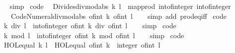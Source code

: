\begin{isabellebody}
%
\isadelimproof
\ \ %
\endisadelimproof
%
\isatagproof
{}\isamarkupfalse%
\ simp%
\endisatagproof
{\isafoldproof}%
%
\isadelimproof
\isanewline
%
\endisadelimproof
\isanewline
{}\isamarkupfalse%
\ {\isacharbrackleft}code{\isacharbrackright}{\isacharcolon}\isanewline
\ \ {\isachardoublequoteopen}Divides{\isachardot}divmod{\isacharunderscore}abs\ k\ l\ {\isacharequal}\ map{\isacharunderscore}prod\ int{\isacharunderscore}of{\isacharunderscore}integer\ int{\isacharunderscore}of{\isacharunderscore}integer\isanewline
\ \ \ \ {\isacharparenleft}Code{\isacharunderscore}Numeral{\isachardot}divmod{\isacharunderscore}abs\ {\isacharparenleft}of{\isacharunderscore}int\ k{\isacharparenright}\ {\isacharparenleft}of{\isacharunderscore}int\ l{\isacharparenright}{\isacharparenright}{\isachardoublequoteclose}\isanewline
%
\isadelimproof
\ \ %
\endisadelimproof
%
\isatagproof
{}\isamarkupfalse%
\ {\isacharparenleft}simp\ add{\isacharcolon}\ prod{\isacharunderscore}eq{\isacharunderscore}iff{\isacharparenright}%
\endisatagproof
{\isafoldproof}%
%
\isadelimproof
\isanewline
%
\endisadelimproof
\isanewline
{}\isamarkupfalse%
\ {\isacharbrackleft}code{\isacharbrackright}{\isacharcolon}\isanewline
\ \ {\isachardoublequoteopen}k\ div\ l\ {\isacharequal}\ int{\isacharunderscore}of{\isacharunderscore}integer\ {\isacharparenleft}of{\isacharunderscore}int\ k\ div\ of{\isacharunderscore}int\ l{\isacharparenright}{\isachardoublequoteclose}\isanewline
%
\isadelimproof
\ \ %
\endisadelimproof
%
\isatagproof
{}\isamarkupfalse%
\ simp%
\endisatagproof
{\isafoldproof}%
%
\isadelimproof
\isanewline
%
\endisadelimproof
\isanewline
{}\isamarkupfalse%
\ {\isacharbrackleft}code{\isacharbrackright}{\isacharcolon}\isanewline
\ \ {\isachardoublequoteopen}k\ mod\ l\ {\isacharequal}\ int{\isacharunderscore}of{\isacharunderscore}integer\ {\isacharparenleft}of{\isacharunderscore}int\ k\ mod\ of{\isacharunderscore}int\ l{\isacharparenright}{\isachardoublequoteclose}\isanewline
%
\isadelimproof
\ \ %
\endisadelimproof
%
\isatagproof
{}\isamarkupfalse%
\ simp%
\endisatagproof
{\isafoldproof}%
%
\isadelimproof
\isanewline
%
\endisadelimproof
\isanewline
{}\isamarkupfalse%
\ {\isacharbrackleft}code{\isacharbrackright}{\isacharcolon}\isanewline
\ \ {\isachardoublequoteopen}HOL{\isachardot}equal\ k\ l\ {\isacharequal}\ HOL{\isachardot}equal\ {\isacharparenleft}of{\isacharunderscore}int\ k\ {\isacharcolon}{\isacharcolon}\ integer{\isacharparenright}\ {\isacharparenleft}of{\isacharunderscore}int\ l{\isacharparenright}{\isachardoublequoteclose}\isanewline

\end{isabellebody}
